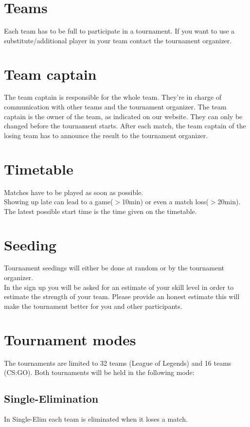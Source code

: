 \documentclass{article}
\begin{document}
\section{Teams}
Each team has to be full to participate in a tournament. If you want to use a substitute/additional player in your team contact the tournament organizer.

\section{Team captain}
The team captain is responsible for the whole team. They're in charge of
communication with other teams and the tournament organizer.
The team captain is the owner of the team, as indicated on our website.
They can only be changed before the tournament starts. After each match, the team captain of the losing team has to announce the result to the tournament organizer.


\section{Timetable}
Matches have to be played as soon as possible.\\
Showing up late can lead to a game($>$10min) or even a match loss($>$20min). The latest possible start time is the time given on the timetable.


\section{Seeding}
Tournament seedings will either be done at random or by the tournament organizer.\\
In the sign up you will be asked for an estimate of your skill level in order to estimate the strength of your team.
Please provide an honest estimate this will make the tournament better for you and other participants.


\section{Tournament modes}
The tournaments are limited to 32 teams (League of Legends) and 16 teams (CS:GO).
Both tournaments will be held in the following mode:

\subsection{Single-Elimination}
In Single-Elim each team is eliminated when it loses a match.\\
\end{document}
